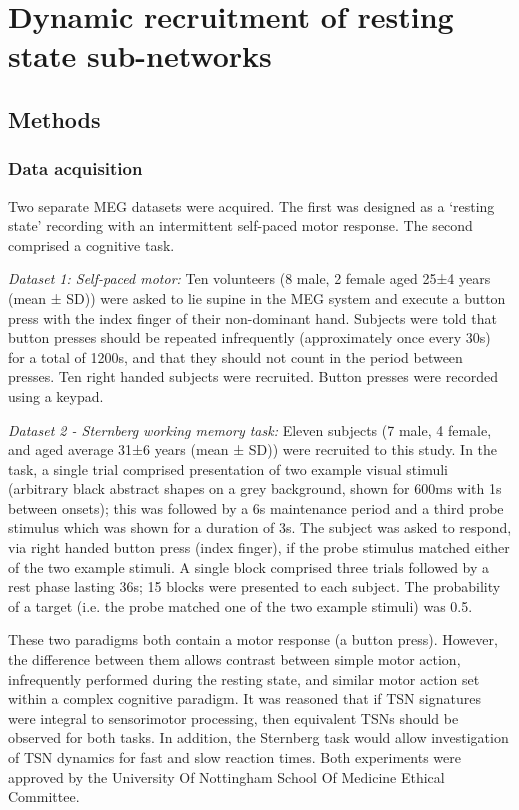 \chapter{Dynamic recruitment of resting state sub-networks}\label{chap_kmeans}

\section{Methods}

\subsection{Data acquisition}

Two separate MEG datasets were acquired. The first was designed as a ‘resting state’ recording with an intermittent self-paced motor response. The second comprised a cognitive task.

\textit{Dataset 1: Self-paced motor:} Ten volunteers (8 male, 2 female aged 25±4 years (mean ± SD)) were asked to lie supine in the MEG system and execute a button press with the index finger of their non-dominant hand. Subjects were told that button presses should be repeated infrequently (approximately once every 30s) for a total of 1200s, and that they should not count in the period between presses. Ten right handed subjects were recruited. Button presses were recorded using a keypad.

\textit{Dataset 2 - Sternberg working memory task:} Eleven subjects (7 male, 4 female, and aged average 31±6 years (mean ± SD)) were recruited to this study. In the task, a single trial comprised presentation of two example visual stimuli (arbitrary black abstract shapes on a grey background, shown for 600ms with 1s between onsets); this was followed by a 6s maintenance period and a third probe stimulus which was shown for a duration of 3s. The subject was asked to respond, via right handed button press (index finger), if the probe stimulus matched either of the two example stimuli. A single block comprised three trials followed by a rest phase lasting 36s; 15 blocks were presented to each subject. The probability of a target (i.e. the probe matched one of the two example stimuli) was 0.5.

These two paradigms both contain a motor response (a button press). However, the difference between them allows contrast between simple motor action, infrequently performed during the resting state, and similar motor action set within a complex cognitive paradigm. It was reasoned that if TSN signatures were integral to sensorimotor processing, then equivalent TSNs should be observed for both tasks. In addition, the Sternberg task would allow investigation of TSN dynamics for fast and slow reaction times. Both experiments were approved by the University Of Nottingham School Of Medicine Ethical Committee. 

